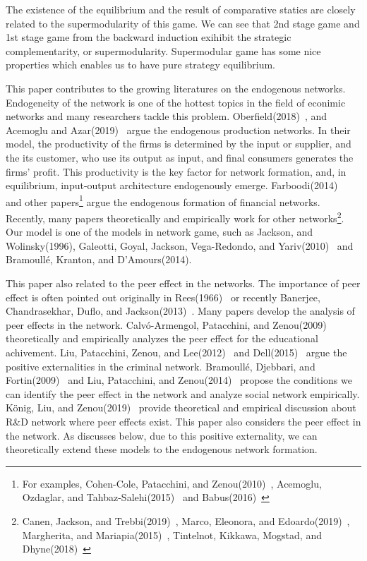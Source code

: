 \documentclass[12pt]{article}
\theoremstyle{definition}
\begin{document}
The existence of the equilibrium and the result of comparative statics are closely related to the supermodularity of this game.
We can see that 2nd stage game and 1st stage game from the backward induction exihibit the strategic complementarity, or supermodularity.
Supermodular game has some nice properties which enables us to have pure strategy equilibrium.

This paper contributes to the growing literatures on the endogenous networks.
Endogeneity of the network is one of the hottest topics in the field of econimic networks and many researchers tackle this problem.
Oberfield(2018)~\cite{ober}, and Acemoglu and Azar(2019)~\cite{endo_net} argue the endogenous production networks.
In their model, the productivity of the firms is determined by the input or supplier, and the its customer, who use its output as input, and final consumers generates the firms' profit.
This productivity is the key factor for network formation, and, in equilibrium, input-output architecture endogenously emerge.
Farboodi(2014)~\cite{farboodi} and other papers\footnote{For examples, Cohen-Cole, Patacchini, and Zenou(2010)~\cite{cohen}, Acemoglu, Ozdaglar, and Tahbaz-Salehi(2015)~\cite{acemo2015} and Babus(2016)~\cite{babus}} argue the endogenous formation of financial networks.
Recently, many papers theoretically and empirically work for other networks\footnote{Canen, Jackson, and Trebbi(2019)~\cite{canen}, Marco, Eleonora, and Edoardo(2019)~\cite{Marco2019}, Margherita, and Mariapia(2015)~\cite{marg}, Tintelnot, Kikkawa, Mogstad, and Dhyne(2018)~\cite{Tin}}.
Our model is one of the models in network game, such as Jackson, and Wolinsky(1996), Galeotti, Goyal, Jackson, Vega-Redondo, and Yariv(2010)~\cite{galeo} and Bramoull\'{e}, Kranton, and D'Amours(2014).

This paper also related to the peer effect in the networks.
The importance of peer effect is often pointed out originally in Rees(1966)~\cite{Rees} or recently Banerjee, Chandrasekhar, Duflo, and Jackson(2013)~\cite{ban}.
Many papers develop the analysis of peer effects in the network.
Calv\'{o}-Armengol, Patacchini, and Zenou(2009)~\cite{edu} theoretically and empirically analyzes the peer effect for the educational achivement.
Liu, Patacchini, Zenou, and Lee(2012)~\cite{criminal} and Dell(2015)~\cite{Dell} argue the positive externalities in the criminal network.
Bramoull\'{e}, Djebbari, and Fortin(2009)~\cite{identificationpeer} and Liu, Patacchini, and Zenou(2014)~\cite{endopeer} propose the conditions we can identify the peer effect in the network and analyze social network empirically.
K\"{o}nig, Liu, and Zenou(2019)~\cite {RandD} provide theoretical and empirical discussion about R\&D network where peer effects exist.
This paper also considers the peer effect in the network.
As discusses below, due to this positive externality, we can theoretically extend these models to the endogenous network formation.
\end{document}
